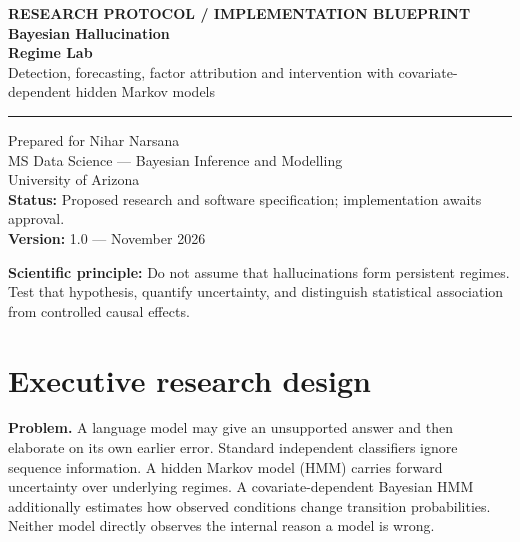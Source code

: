 \documentclass[11pt,letterpaper]{article}
\newcommand{\sectionpage}[1]{\clearpage\section{#1}}
\begin{document}
\begin{titlepage}
\color{navy}
\vspace*{1.2cm}
{\Large\textbf{RESEARCH PROTOCOL / IMPLEMENTATION BLUEPRINT}}\\[1cm]
{\Huge\bfseries Bayesian Hallucination\\ Regime Lab}\\[.5cm]
{\LARGE Detection, forecasting, factor attribution and intervention with covariate-dependent hidden Markov models}\\[1cm]
\rule{\linewidth}{2pt}
\vspace{.6cm}

{\large Prepared for Nihar Narsana\\ MS Data Science --- Bayesian Inference and Modelling\\ University of Arizona}\\[.7cm]
\textbf{Status:} Proposed research and software specification; implementation awaits approval.\\
\textbf{Version:} 1.0 --- November 2026

\vfill
{}

\vspace{.5cm}
\textbf{Scientific principle:} Do not assume that hallucinations form persistent regimes. Test that hypothesis, quantify uncertainty, and distinguish statistical association from controlled causal effects.
\end{titlepage}
\tableofcontents
\sectionpage{Executive research design}
\textbf{Problem.} A language model may give an unsupported answer and then elaborate on its own earlier error. Standard independent classifiers ignore sequence information. A hidden Markov model (HMM) carries forward uncertainty over underlying regimes. A covariate-dependent Bayesian HMM additionally estimates how observed conditions change transition probabilities. Neither model directly observes the internal reason a model is wrong.
\end{document}
